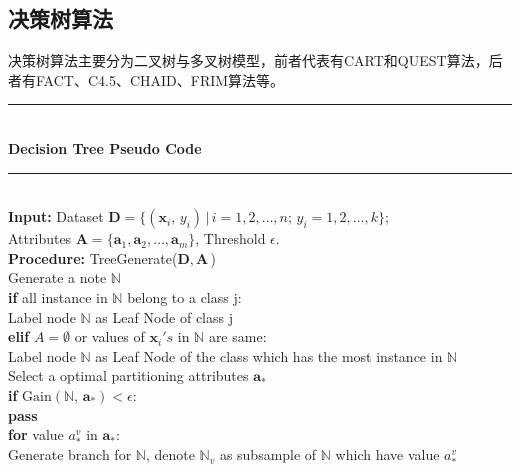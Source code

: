 \documentclass[a4paper]{article}
\begin{document}
	\subsection{决策树算法}
	决策树算法主要分为二叉树与多叉树模型，前者代表有CART和QUEST算法，后者有FACT、C4.5、CHAID、FRIM算法等。\\
	\noindent\rule[0.1\baselineskip]{\textwidth}{0.75pt}\\
	\textbf{Decision Tree Pseudo Code}\\
	\noindent\rule[0.1\baselineskip]{\textwidth}{0.5pt}\\
	\textbf{Input:}	Dataset $\textbf{D} = \{(\textbf{x}_i,\,y_i)\,|\,i = 1, 2,\dots, n;\, y_i = 1, 2, ..., k\}$;\\
	\hspace*{32pt}	Attributes $\textbf{A} = \{\textbf{a}_1,\textbf{a}_2,\dots, \textbf{a}_m\}$, Threshold $\epsilon$. \\
	\textbf{Procedure:}	TreeGenerate($\textbf{D},\,\textbf{A}$)\\
			\hspace*{32pt}	Generate a note $\mathbb{N}$\\
			\hspace*{32pt}	\textbf{if} all instance in $\mathbb{N}$ belong to a class j:\\
			\hspace*{48pt}	Label node $\mathbb{N}$ as Leaf Node of class j\\
			\hspace*{32pt}	\textbf{elif} $A = \emptyset$ or values of $\textbf{x}_{i}'s$ in $\mathbb{N}$ are same:\\
			\hspace*{48pt}	Label node $\mathbb{N}$ as Leaf Node of the class which has the most instance in $\mathbb{N}$ \\
			\hspace*{32pt}	Select a optimal partitioning attributes $\textbf{a}_*$\\
			\hspace*{32pt}	\textbf{if} $\text{Gain}(\mathbb{N},\,\textbf{a}_*) < \epsilon$:\\
			\hspace*{48pt}	\textbf{pass}\\
			\hspace*{32pt}	\textbf{for} value $a_*^{v}$ in $\textbf{a}_*$:\\
			\hspace*{48pt}	Generate branch for $\mathbb{N}$, denote $\mathbb{N}_v$ as subsample of $\mathbb{N}$ which have value $a_*^{v}$\\
\end{document}
